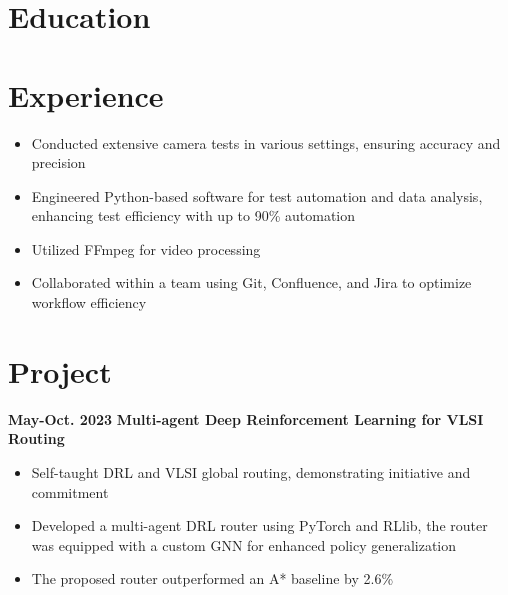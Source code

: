 \documentclass[11pt,a4paper,sans]{moderncv}
\begin{document}
\makecvtitle

\section{Education}

\section{Experience}
{
    \begin{itemize}
    \item Conducted extensive camera tests in various settings, ensuring accuracy and precision
    \item Engineered Python-based software for test automation and data analysis, enhancing test efficiency with up to 90\% automation
    \item Utilized FFmpeg for video processing
    \item Collaborated within a team using Git, Confluence, and Jira to optimize workflow efficiency
    \end{itemize}
}

\section{Project}

\cventry
{\textnormal{\textbf{May-Oct. 2023}}}
{\textnormal{\textbf{Multi-agent Deep Reinforcement Learning for VLSI Routing}}}
{}{}{}
{
    \begin{itemize}
    \item Self-taught DRL and VLSI global routing, demonstrating initiative and commitment
    \item Developed a multi-agent DRL router using PyTorch and RLlib, the router was equipped with a custom GNN for enhanced policy generalization
    \item The proposed router outperformed an A* baseline by 2.6\%
\end{itemize}
}
\end{document}
